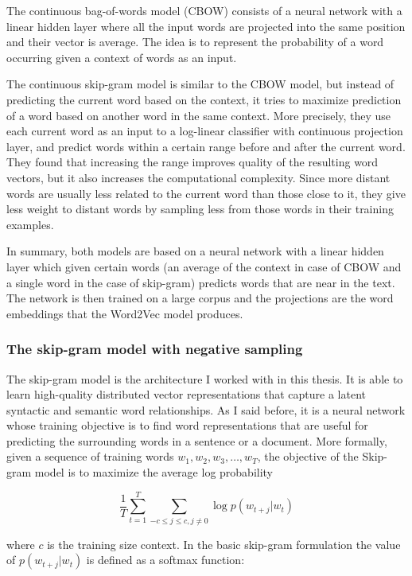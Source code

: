 The continuous bag-of-words model (CBOW) consists of a neural network with a
linear hidden layer where all the input words are projected into the same
position and their vector is average. The idea is to represent the probability
of a word occurring given a context of words as an input.

The continuous skip-gram model is similar to the CBOW model, but instead of
predicting the current word based on the context, it tries to maximize
prediction of a word based on another word in the same context. More precisely,
they use each current word as an input to a log-linear classifier with
continuous projection layer, and predict words within a certain range before
and after the current word. They found that increasing the range improves
quality of the resulting word vectors, but it also increases the computational
complexity. Since more distant words are usually less related to the current
word than those close to it, they give less weight to distant words by sampling
less from those words in their training examples.

In summary, both models are based on a neural network with a linear hidden
layer which given certain words (an average of the context in case of CBOW and
a single word in the case of skip-gram) predicts words that are near in the
text. The network is then trained on a large corpus and the projections are the
word embeddings that the Word2Vec model produces.

\subsubsection{The skip-gram model with negative sampling}

The skip-gram model is the architecture I worked with in this thesis. It is
able to learn high-quality distributed vector representations that capture a
latent syntactic and semantic word relationships. As I said before, it is a
neural network whose training objective is to find word representations that
are useful for predicting the surrounding words in a sentence or a document.
More formally, given a sequence of training words $w_1, w_2, w_3, \dots, w_T$,
the objective of the Skip-gram model is to maximize the average log probability

\[
  \frac{1}{T}
  \sum^{T}_{t=1}\sum_{-c \leq j \leq c, j \ne 0}
  \log p(w_{t+j}|w_t)
\]

where $c$ is the training size context. In the basic skip-gram formulation the
value of $p(w_{t+j}|w_t)$ is defined as a softmax function:

